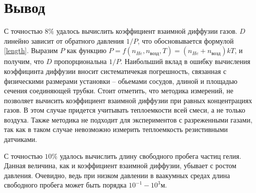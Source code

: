 \documentclass{article}
\begin{document}
\section{Вывод}

С точностью $8 \% $ удалось вычислить коэффициент взаимной диффузии газов. $D$ линейно зависит от обратного давления $1/P$, что обосновывается формулой \eqref{length}. Выразим $P$ как функцию $P = f(n_{He},n_{\text{возд}},T) = (n_{He}+n_{\text{возд}}) k T$, и получим, что $D$ пропорциональна $1/P$. Наибольший вклад в ошибку вычисления коэффицинта диффузии вносит систематичекая погрешность, связанная с физическими размерами установки -- обьемами сосудов, длиной и площадью сечения соединяющей трубки. Стоит отметить, что методика измерений, не позволяет вычисить коэффициент взаимной диффузии при равных концентрациях газов. В этом случае придется учитывать теплоемкости всей смеси, а не только воздуха. Также методика не подходит для экспериментов с разреженными газами, так как в таком случае невозможно измерить теплоемкость резистивными датчиками.

С точностью $10 \%$ удалось вычислить длину свободного пробега частиц гелия. Данная величина, как и коэффициент взаимной диффузии, убывает с ростом давления. Очевидно, ведь при низком давлении в ваакумных средах длина свободного пробега может быть порядка $10^{-1} - 10^{3} \text{м}$.
\end{document}

